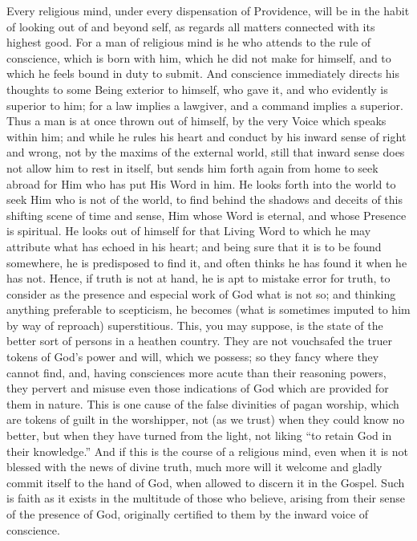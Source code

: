 Every religious mind, under every dispensation of Providence, will
be in the habit of looking out of and beyond self, as regards all
matters connected with its highest good. For a man of religious mind
is he who attends to the rule of conscience, which is born with him,
which he did not make for himself, and to which he feels bound in duty
to submit. And conscience immediately directs his thoughts to some
Being exterior to himself, who gave it, and who evidently is superior
to him; for a law implies a lawgiver, and a command implies a
superior. Thus a man is at once thrown out of himself, by the very
Voice which speaks within him; and while he rules his heart and
conduct by his inward sense of right and wrong, not by the maxims of
the external world, still that inward sense does not allow him to rest
in itself, but sends him forth again from home to seek abroad for Him
who has put His Word in him. He looks forth into the world to seek Him
who is not of the world, to find behind the shadows and deceits of
this shifting scene of time and sense, Him whose Word is eternal, and
whose Presence is spiritual. He looks out of himself for that Living
Word to which he may attribute what has echoed in his heart; and being
sure that it is to be found somewhere, he is predisposed to find it,
and often thinks he has found it when he has not. Hence, if truth is
not at hand, he is apt to mistake error for truth, to consider as the
presence and especial work of God what is not so; and thinking
anything preferable to scepticism, he becomes (what is sometimes
imputed to him by way of reproach) superstitious. This, you may
suppose, is the state of the better sort of persons in a heathen
country. They are not vouchsafed the truer tokens of God's power and
will, which we possess; so they fancy where they cannot find, and,
having consciences more acute than their reasoning powers, they
pervert and misuse even those indications of God which are provided
for them in nature. This is one cause of the false divinities of pagan
worship, which are tokens of guilt in the worshipper, not (as we
trust) when they could know no better, but when they have turned from
the light, not liking ``to retain God in their knowledge.''
And if this is the course of a religious mind, even when it is not
blessed with the news of divine truth, much more will it welcome and
gladly commit itself to the hand of God, when allowed to discern it in
the Gospel. Such is faith as it exists in the multitude of those who
believe, arising from their sense of the presence of God, originally
certified to them by the inward voice of conscience.

